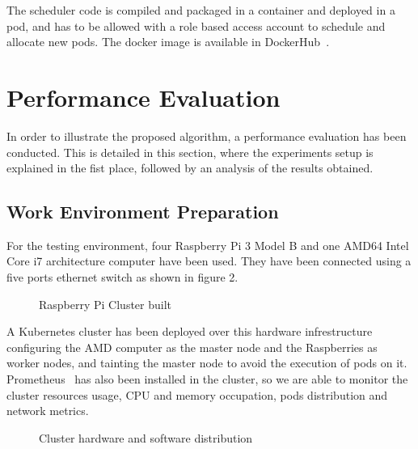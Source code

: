 \documentclass[conference]{IEEEtran}
\begin{document}
The scheduler code is compiled and packaged in a container and deployed in a pod, and has to be allowed with a role based access account to schedule
and allocate new pods. The docker image is available in DockerHub~\cite{dockerhub}.


\section{Performance Evaluation}\label{sec:eval}

In order to illustrate the proposed algorithm, a performance evaluation has been conducted. This is detailed in this section, where the experiments setup is explained in the fist place, followed by an analysis of the results obtained. 


\subsection{Work Environment Preparation}\label{sec:env}

For the testing environment, four Raspberry Pi 3 Model B and one AMD64 Intel Core i7 architecture computer have been used. They have been connected using a five ports ethernet switch as shown in figure 2. 

\begin{figure}[h]
\begin{center}
\strut{}
\caption{Raspberry Pi Cluster built}\label{fig:cluster}
\end{center}
\end{figure}

A Kubernetes cluster has been deployed over this hardware infrestructure configuring the AMD computer as the master node and
the Raspberries as worker nodes, and tainting the master node to avoid the execution of pods on it. Prometheus~\cite{prometheus}
has also been installed in the cluster, so we are able to monitor the cluster resources usage, CPU and memory occupation, pods distribution and network metrics.

\begin{figure}[h]
\begin{center}
\strut{}
\caption{Cluster hardware and software distribution}\label{fig:cluster}
\end{center}
\end{figure}
\end{document}
